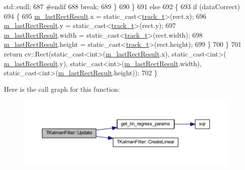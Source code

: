 \begin{DoxyCode}
       std::endl;
687 \textcolor{preprocessor}{#endif}
688             \textcolor{keywordflow}{break};
689         \}
690     \}
691     \textcolor{keywordflow}{else}
692     \{
693         \textcolor{keywordflow}{if} (dataCorrect)
694         \{
695             \mbox{\hyperlink{class_t_kalman_filter_aed4818c7aac455928ef02dd03f8bfe56}{m\_lastRectResult}}.x = \textcolor{keyword}{static\_cast<}\mbox{\hyperlink{defines_8h_a7ce9c8817b42ab418e61756f579549ab}{track\_t}}\textcolor{keyword}{>}(rect.x);
696             \mbox{\hyperlink{class_t_kalman_filter_aed4818c7aac455928ef02dd03f8bfe56}{m\_lastRectResult}}.y = \textcolor{keyword}{static\_cast<}\mbox{\hyperlink{defines_8h_a7ce9c8817b42ab418e61756f579549ab}{track\_t}}\textcolor{keyword}{>}(rect.y);
697             \mbox{\hyperlink{class_t_kalman_filter_aed4818c7aac455928ef02dd03f8bfe56}{m\_lastRectResult}}.width = \textcolor{keyword}{static\_cast<}\mbox{\hyperlink{defines_8h_a7ce9c8817b42ab418e61756f579549ab}{track\_t}}\textcolor{keyword}{>}(rect.width);
698             \mbox{\hyperlink{class_t_kalman_filter_aed4818c7aac455928ef02dd03f8bfe56}{m\_lastRectResult}}.height = \textcolor{keyword}{static\_cast<}\mbox{\hyperlink{defines_8h_a7ce9c8817b42ab418e61756f579549ab}{track\_t}}\textcolor{keyword}{>}(rect.height);
699         \}
700     \}
701     \textcolor{keywordflow}{return} cv::Rect(static\_cast<int>(\mbox{\hyperlink{class_t_kalman_filter_aed4818c7aac455928ef02dd03f8bfe56}{m\_lastRectResult}}.x), static\_cast<int>(
      \mbox{\hyperlink{class_t_kalman_filter_aed4818c7aac455928ef02dd03f8bfe56}{m\_lastRectResult}}.y), static\_cast<int>(\mbox{\hyperlink{class_t_kalman_filter_aed4818c7aac455928ef02dd03f8bfe56}{m\_lastRectResult}}.width), 
      static\_cast<int>(\mbox{\hyperlink{class_t_kalman_filter_aed4818c7aac455928ef02dd03f8bfe56}{m\_lastRectResult}}.height));
702 \}
\end{DoxyCode}
Here is the call graph for this function\+:\nopagebreak
\begin{figure}[H]
\begin{center}
\leavevmode
\includegraphics[width=350pt]{class_t_kalman_filter_a8018c71227761d4e7a2d83108eea0220_cgraph}
\end{center}
\end{figure}


